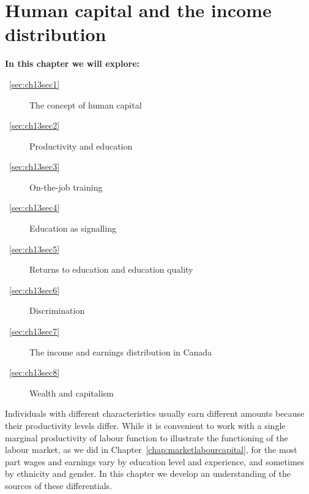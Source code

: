 \chapter{Human capital and the income distribution} \label{chap:humancapital}

\begin{topics}
\textbf{In this chapter we will explore:}
\begin{description}
\item [~\ref{sec:ch13sec1}] The concept of human capital
\item [~\ref{sec:ch13sec2}] Productivity and education
\item [~\ref{sec:ch13sec3}] On-the-job training
\item [~\ref{sec:ch13sec4}] Education as signalling
\item [~\ref{sec:ch13sec5}] Returns to education and education quality
\item [~\ref{sec:ch13sec6}] Discrimination
\item [~\ref{sec:ch13sec7}] The income and earnings distribution in Canada
\item [~\ref{sec:ch13sec8}] Wealth and capitalism
\end{description}
\end{topics}

Individuals with different characteristics usually earn different amounts because their productivity levels differ. While it is convenient to work with a single marginal productivity of labour function to illustrate the functioning of the labour market, as we did in Chapter~\ref{chap:marketlabourcapital}, for the most part wages and earnings vary by education level and experience, and sometimes by ethnicity and gender. In this chapter we develop an understanding of the sources of these differentials.